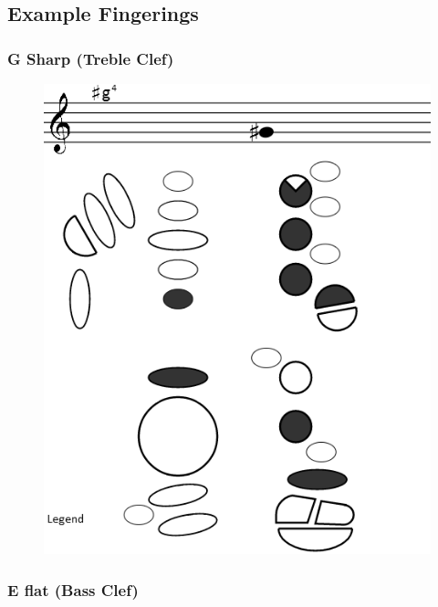 \documentclass[12pt,english]{article}
\begin{document}
\subsection{Example Fingerings}


\subsubsection{G Sharp (Treble Clef)}

\begin{figure}[H]
\caption{}


\begin{centering}
\includegraphics[scale=0.6]{fingering3}
\par\end{centering}

\end{figure}



\subsubsection{E flat (Bass Clef)}
\end{document}
